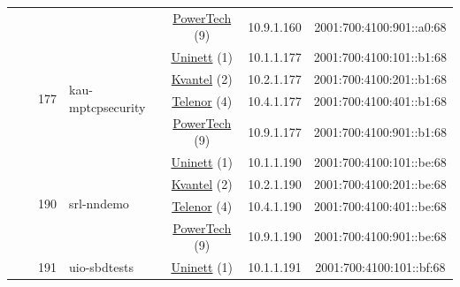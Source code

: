 \begin{small}
\begin{center}
\begin{longtable}{|c|c|c|c|c|c|c|c|}
  &  &  &  & \multicolumn{2}{|c|}{\tiny{\href{http://www.powertech.no}{PowerTech} (9)}} & \tiny{10.9.1.160} & \tiny{2001:700:4100:901::a0:68} \\* \cline{3-3}\cline{4-4}\cline{5-5}\cline{6-6}\cline{7-7}\cline{8-8}
  &  & \multirow{4}{*}{\tiny{177}} & \multicolumn{1}{|l|}{\multirow{4}{*}{\tiny{kau-mptcpsecurity}}} & \multicolumn{2}{|c|}{\tiny{\href{https://www.uninett.no}{Uninett} (1)}} & \tiny{10.1.1.177} & \tiny{2001:700:4100:101::b1:68} \\* \cline{5-5}\cline{6-6}\cline{7-7}\cline{8-8}
  &  &  &  & \multicolumn{2}{|c|}{\tiny{\href{http://kvantel.no}{Kvantel} (2)}} & \tiny{10.2.1.177} & \tiny{2001:700:4100:201::b1:68} \\* \cline{5-5}\cline{6-6}\cline{7-7}\cline{8-8}
  &  &  &  & \multicolumn{2}{|c|}{\tiny{\href{https://www.telenor.no}{Telenor} (4)}} & \tiny{10.4.1.177} & \tiny{2001:700:4100:401::b1:68} \\* \cline{5-5}\cline{6-6}\cline{7-7}\cline{8-8}
  &  &  &  & \multicolumn{2}{|c|}{\tiny{\href{http://www.powertech.no}{PowerTech} (9)}} & \tiny{10.9.1.177} & \tiny{2001:700:4100:901::b1:68} \\* \cline{3-3}\cline{4-4}\cline{5-5}\cline{6-6}\cline{7-7}\cline{8-8}
  &  & \multirow{4}{*}{\tiny{190}} & \multicolumn{1}{|l|}{\multirow{4}{*}{\tiny{srl-nndemo}}} & \multicolumn{2}{|c|}{\tiny{\href{https://www.uninett.no}{Uninett} (1)}} & \tiny{10.1.1.190} & \tiny{2001:700:4100:101::be:68} \\* \cline{5-5}\cline{6-6}\cline{7-7}\cline{8-8}
  &  &  &  & \multicolumn{2}{|c|}{\tiny{\href{http://kvantel.no}{Kvantel} (2)}} & \tiny{10.2.1.190} & \tiny{2001:700:4100:201::be:68} \\* \cline{5-5}\cline{6-6}\cline{7-7}\cline{8-8}
  &  &  &  & \multicolumn{2}{|c|}{\tiny{\href{https://www.telenor.no}{Telenor} (4)}} & \tiny{10.4.1.190} & \tiny{2001:700:4100:401::be:68} \\* \cline{5-5}\cline{6-6}\cline{7-7}\cline{8-8}
  &  &  &  & \multicolumn{2}{|c|}{\tiny{\href{http://www.powertech.no}{PowerTech} (9)}} & \tiny{10.9.1.190} & \tiny{2001:700:4100:901::be:68} \\* \cline{3-3}\cline{4-4}\cline{5-5}\cline{6-6}\cline{7-7}\cline{8-8}
  &  & \multirow{4}{*}{\tiny{191}} & \multicolumn{1}{|l|}{\multirow{4}{*}{\tiny{uio-sbdtests}}} & \multicolumn{2}{|c|}{\tiny{\href{https://www.uninett.no}{Uninett} (1)}} & \tiny{10.1.1.191} & \tiny{2001:700:4100:101::bf:68} \\* \cline{5-5}\cline{6-6}\cline{7-7}\cline{8-8}

\end{longtable}
\end{center}
\end{small}
